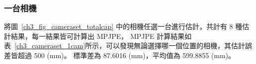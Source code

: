 \subsubsection{一台相機}
將圖~\ref{ch3_fig_cameraset_totalcap} 中的相機任選一台進行估計，共計有 8 種估計結果，每一結果皆可計算出 MPJPE，
MPJPE 計算結果如表~\ref{ch3_cameraset_1cam}所示，可以發現無論選擇哪一個位置的相機，其估計誤差皆超過 500 (mm)。
標準差為 87.6016 (mm)，平均值為 599.8855 (mm)。
\begin{table}[!ht]
   \caption[一台相機組合與其估計結果誤差]{一台相機組合與其估計結果誤差}
   \centering
   \label{ch3_cameraset_1cam}
   \setlength{\tabcolsep}{3pt}
   \renewcommand\arraystretch{1.5}
\end{table}
\clearpage

